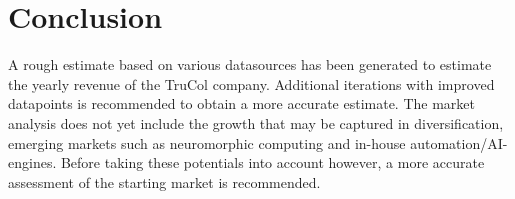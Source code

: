 \section{Conclusion}\label{sec:conclusion}
A rough estimate based on various datasources has been generated to estimate the yearly revenue of the TruCol company. Additional iterations with improved datapoints is recommended to obtain a more accurate estimate. The market analysis does not yet include the growth that may be captured in diversification, emerging markets such as neuromorphic computing and in-house automation/AI-engines. Before taking these potentials into account however, a more accurate assessment of the starting market is recommended.